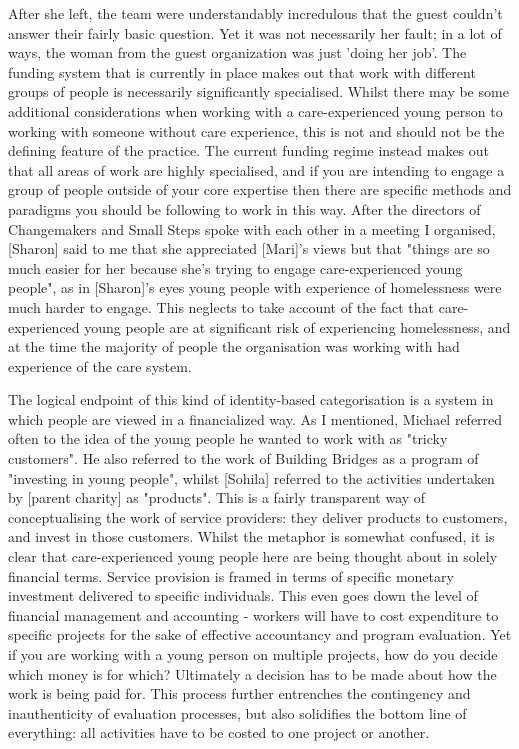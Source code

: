 After she left, the team were understandably incredulous that the guest couldn't answer their fairly basic question. Yet it was not necessarily her fault; in a lot of ways, the woman from the guest organization was just 'doing her job'. The funding system that is currently in place makes out that work with different groups of people is necessarily significantly specialised. Whilst there may be some additional considerations when working with a care-experienced young person to working with someone without care experience, this is not and should not be the defining feature of the practice. The current funding regime instead makes out that all areas of work are highly specialised, and if you are intending to engage a group of people outside of your core expertise then there are specific methods and paradigms you should be following to work in this way. After the directors of Changemakers and Small Steps spoke with each other in a meeting I organised, [Sharon] said to me that she appreciated [Mari]'s views but that "things are so much easier for her because she's trying to engage care-experienced young people", as in [Sharon]'s eyes young people with experience of homelessness were much harder to engage. This neglects to take account of the fact that care-experienced young people are at significant risk of experiencing homelessness, and at the time the majority of people the organisation was working with had experience of the care system.

The logical endpoint of this kind of identity-based categorisation is a system in which people are viewed in a financialized way. As I mentioned, Michael referred often to the idea of the young people he wanted to work with as "tricky customers". He also referred to the work of Building Bridges as a program of "investing in young people", whilst [Sohila] referred to the activities undertaken by [parent charity] as "products". This is a fairly transparent way of conceptualising the work of service providers: they deliver products to customers, and invest in those customers. Whilst the metaphor is somewhat confused, it is clear that care-experienced young people here are being thought about in solely financial terms. Service provision is framed in terms of specific monetary investment delivered to specific individuals. This even goes down the level of financial management and accounting - workers will have to cost expenditure to specific projects for the sake of effective accountancy and program evaluation. Yet if you are working with a young person on multiple projects, how do you decide which money is for which? Ultimately a decision has to be made about how the work is being paid for. This process further entrenches the contingency and inauthenticity of evaluation processes, but also solidifies the bottom line of everything: all activities have to be costed to one project or another.

